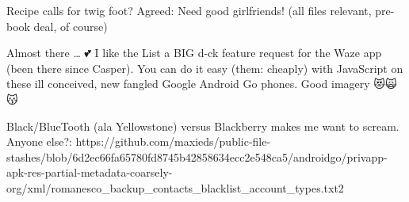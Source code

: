 Recipe calls for twig foot? Agreed: Need good girlfriends! (all files relevant, pre-book deal, of course)

Almost there … 💕 I like the List a BIG d-ck feature request for the Waze app (been there since Casper). You can do it easy (them: cheaply) with JavaScript on these ill conceived, new fangled Google Android Go phones. Good imagery 😻🙀😽

Black/BlueTooth (ala Yellowstone) versus Blackberry makes me want to scream. Anyone else?: 
https://github.com/maxieds/public-file-stashes/blob/6d2ec66fa65780fd8745b42858634ecc2e548ca5/androidgo/privapp-apk-res-partial-metadata-coarsely-org/xml/romanesco_backup_contacts_blacklist_account_types.txt2